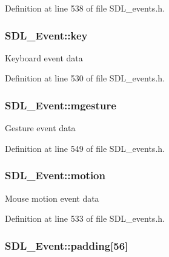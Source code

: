 Definition at line 538 of file S\-D\-L\-\_\-events.\-h.

\hypertarget{union_s_d_l___event_ab99927835cc77a9b6bb50b419b4a27df}{
\subsubsection[{key}]{ S\-D\-L\-\_\-\-Event\-::key}}\label{union_s_d_l___event_ab99927835cc77a9b6bb50b419b4a27df}
Keyboard event data 

Definition at line 530 of file S\-D\-L\-\_\-events.\-h.

\hypertarget{union_s_d_l___event_ac19b3c6a6b5181a51eb4fbe2cbe726a9}{
\subsubsection[{mgesture}]{ S\-D\-L\-\_\-\-Event\-::mgesture}}\label{union_s_d_l___event_ac19b3c6a6b5181a51eb4fbe2cbe726a9}
Gesture event data 

Definition at line 549 of file S\-D\-L\-\_\-events.\-h.

\hypertarget{union_s_d_l___event_ac3c89e190faacbe84280cd539453bab6}{
\subsubsection[{motion}]{ S\-D\-L\-\_\-\-Event\-::motion}}\label{union_s_d_l___event_ac3c89e190faacbe84280cd539453bab6}
Mouse motion event data 

Definition at line 533 of file S\-D\-L\-\_\-events.\-h.

\hypertarget{union_s_d_l___event_aabb599570edfa54aad6255c1f24f2ad2}{
\subsubsection[{padding}]{ S\-D\-L\-\_\-\-Event\-::padding\mbox{[}56\mbox{]}}}\label{union_s_d_l___event_aabb599570edfa54aad6255c1f24f2ad2}



